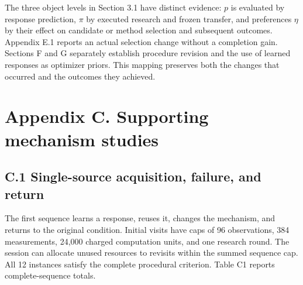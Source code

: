 \documentclass[twoside,11pt]{article}
\begin{document}
\endgroup

The three object levels in Section 3.1 have distinct evidence: \(p\) is evaluated by response prediction, \(\pi\) by executed research and frozen transfer, and preferences \(\eta\) by their effect on candidate or method selection and subsequent outcomes. Appendix E.1 reports an actual selection change without a completion gain. Sections F and G separately establish procedure revision and the use of learned responses as optimizer priors. This mapping preserves both the changes that occurred and the outcomes they achieved.


\section*{Appendix C. Supporting mechanism studies}

\subsection*{C.1 Single-source acquisition, failure, and return}

The first sequence learns a response, reuses it, changes the mechanism, and returns to the original condition. Initial visits have caps of 96 observations, 384 measurements, 24,000 charged computation units, and one research round. The session can allocate unused resources to revisits within the summed sequence cap. All 12 instances satisfy the complete procedural criterion. Table C1 reports complete-sequence totals.
\end{document}
